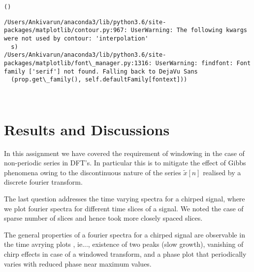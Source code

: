 \documentclass[11pt]{article}
\begin{document}
    \begin{Verbatim}[commandchars=\\\{\}]
()

    \end{Verbatim}

    \begin{Verbatim}[commandchars=\\\{\}]
/Users/Ankivarun/anaconda3/lib/python3.6/site-packages/matplotlib/contour.py:967: UserWarning: The following kwargs were not used by contour: 'interpolation'
  s)
/Users/Ankivarun/anaconda3/lib/python3.6/site-packages/matplotlib/font\_manager.py:1316: UserWarning: findfont: Font family ['serif'] not found. Falling back to DejaVu Sans
  (prop.get\_family(), self.defaultFamily[fontext]))

    \end{Verbatim}

    \begin{center}
    \end{center}
    { \hspace*{\fill} \\}
    
    \section{Results and Discussions}\label{results-and-discussions}

In this assignment we have covered the requirement of windowing in the
case of non-periodic series in DFT's. In particular this is to mitigate
the effect of Gibbs phenomena owing to the discontinuous nature of the
series \(\tilde{x}[n]\) realised by a discrete fourier transform.

The last question addresses the time varying spectra for a chirped
signal, where we plot fourier spectra for different time slices of a
signal. We noted the case of sparse number of slices and hence took more
closely spaced slices.

The general properties of a fourier spectra for a chirped signal are
observable in the time avrying plots , ie..., existence of two peaks
(slow growth), vanishing of chirp effects in case of a windowed
transform, and a phase plot that periodically varies with reduced phase
near maximum values.


    
    
    
    
\end{document}
